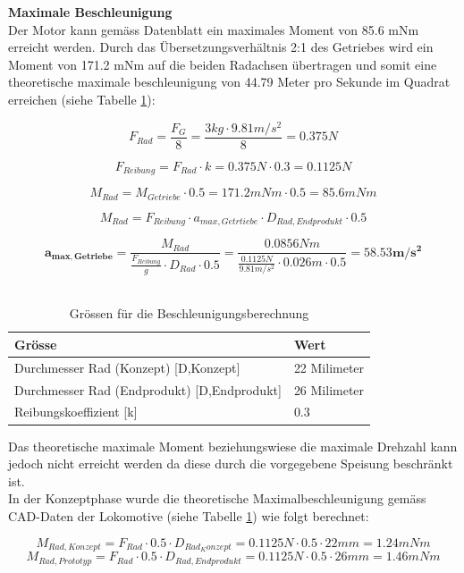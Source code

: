\documentclass[../../main.tex]{subfiles}
\begin{document}
\pagebreak

\textbf{Maximale Beschleunigung}\\
Der Motor kann gemäss Datenblatt ein maximales Moment von 85.6 mNm erreicht werden. Durch das Übersetzungsverhältnis 2:1 des Getriebes wird ein Moment von 171.2 mNm auf die beiden Radachsen übertragen und somit eine theoretische maximale beschleunigung von 44.79 Meter pro Sekunde im Quadrat erreichen (siehe Tabelle \ref{tab:groessen_beschleunigung}):

$$F_{Rad}=\frac{F_{G}}{8}=\frac{3kg \cdot 9.81m/s^2}{8}=0.375N$$

$$F_{Reibung}=F_{Rad} \cdot k=0.375N \cdot 0.3=0.1125N$$

$$M_{Rad}=M_{Getriebe} \cdot 0.5= 171.2 mNm \cdot 0.5 = 85.6 mNm$$

$$M_{Rad}=F_{Reibung} \cdot a_{max, Getrtiebe} \cdot D_{Rad,Endprodukt} \cdot 0.5$$

$$\boldsymbol{a_{max, Getriebe}}=\frac{M_{Rad}}{\frac{F_{Reibung}}{g} \cdot D_{Rad} \cdot 0.5}=\frac{0.0856Nm}{\frac{0.1125N}{9.81m/s^2} \cdot 0.026m \cdot 0.5}=\boldsymbol{58.53m/s^2}$$\\

\begin{table}[H] \centering
  \begin{tabular}{|l|l|}
  \hline
  \textbf{Grösse} & \textbf{Wert}\\
  \hline
  Durchmesser Rad (Konzept) [D,Konzept]          & 22 Milimeter\\
   \hline
   Durchmesser Rad (Endprodukt) [D,Endprodukt]          & 26 Milimeter\\
   \hline
  Reibungskoeffizient [k]      & 0.3\\
  \hline
  \end{tabular}

  \caption{Grössen für die Beschleunigungsberechnung}
  \label{tab:groessen_beschleunigung}
  \end{table}

Das theoretische maximale Moment beziehungswiese die maximale Drehzahl kann jedoch nicht erreicht werden da diese durch die vorgegebene Speisung beschränkt ist.\\
In der Konzeptphase wurde die theoretische Maximalbeschleunigung gemäss CAD-Daten der Lokomotive (siehe Tabelle \ref{tab:groessen_beschleunigung}) wie folgt berechnet:

$$M_{Rad,Konzept}=F_{Rad} \cdot 0.5 \cdot D_{Rad_Konzept}= 0.1125N \cdot 0.5 \cdot 22mm = 1.24mNm$$
$$M_{Rad,Prototyp}=F_{Rad} \cdot 0.5 \cdot D_{Rad,Endprodukt}= 0.1125N \cdot 0.5 \cdot 26mm = 1.46mNm$$
\end{document}
